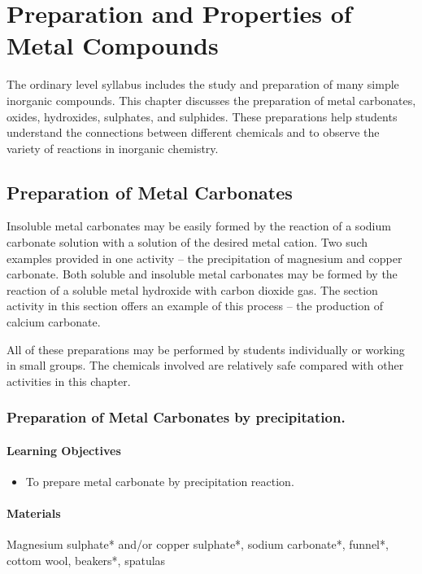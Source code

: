 \chapter{Preparation and Properties of Metal Compounds}

The ordinary level syllabus includes the study and preparation of many simple inorganic compounds. This chapter discusses the preparation of metal carbonates, oxides, hydroxides, sulphates, and sulphides. These preparations help students understand the connections between different chemicals and to observe the variety of reactions in inorganic chemistry.

\section{Preparation of Metal Carbonates}

Insoluble metal carbonates may be easily formed by the reaction of a sodium carbonate solution with a solution of the desired metal cation. Two such examples provided in one activity -- the precipitation of magnesium and copper carbonate. Both soluble and insoluble metal carbonates may be formed by the reaction of a soluble metal hydroxide with carbon dioxide gas. The section activity in this section offers an example of this process -- the production of calcium carbonate.

All of these preparations may be performed by students individually or working in small groups. The chemicals involved are relatively safe compared with other activities in this chapter.

\subsection{Preparation of Metal Carbonates by precipitation.}

\subsubsection*{Learning Objectives}
\begin{itemize}
\item{To prepare metal carbonate by precipitation reaction.}
\end{itemize}

\subsubsection*{Materials}
Magnesium sulphate* and/or copper sulphate*, sodium carbonate*, funnel*, cottom wool, beakers*, spatulas

